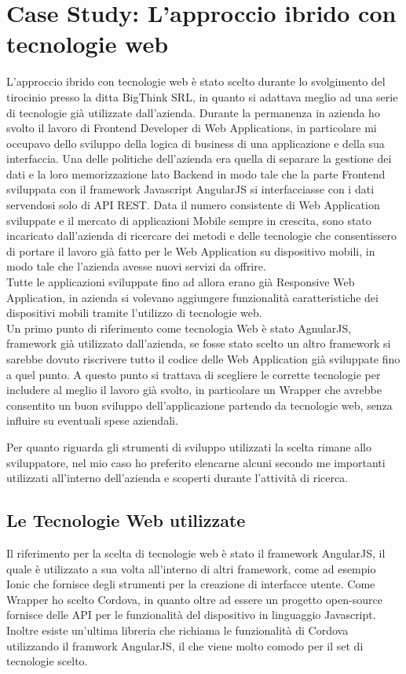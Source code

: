 \chapter{Case Study: L'approccio ibrido con tecnologie web}

L'approccio ibrido con tecnologie web è stato scelto durante lo svolgimento del tirocinio presso la ditta BigThink SRL, in quanto si adattava meglio ad una serie di tecnologie già utilizzate dall'azienda.
Durante la permanenza in azienda ho svolto il lavoro di Frontend Developer di Web Applications, in particolare mi occupavo dello sviluppo della logica di business di una applicazione e della sua interfaccia.
Una delle politiche dell'azienda era quella di separare la gestione dei dati e la loro memorizzazione lato Backend in modo tale che la parte Frontend sviluppata con il framework Javascript AngularJS si interfacciasse con i dati servendosi solo di API REST.
Data il numero consistente di Web Application sviluppate e il mercato di applicazioni Mobile sempre in crescita, sono stato incaricato dall'azienda di ricercare dei metodi e delle tecnologie che consentissero di portare il lavoro già fatto per le Web Application su dispositivo mobili, in modo tale che l'azienda avesse nuovi servizi da offrire.\\
Tutte le applicazioni sviluppate fino ad allora erano già Responsive Web Application, in azienda si volevano aggiungere funzionalità caratteristiche dei dispositivi mobili tramite l'utilizzo di tecnologie web.\\

Un primo punto di riferimento come tecnologia Web è stato AgnularJS, framework già utilizzato dall'azienda, se fosse stato scelto un altro framework si sarebbe dovuto riscrivere tutto il codice delle Web Application già sviluppate fino a quel punto. A questo punto  si trattava di scegliere le corrette tecnologie per includere al meglio il lavoro già svolto, in particolare un Wrapper che avrebbe consentito un buon sviluppo dell'applicazione partendo da tecnologie web, senza influire su eventuali spese aziendali. 

Per quanto riguarda gli strumenti di sviluppo utilizzati la scelta rimane allo sviluppatore, nel mio caso ho preferito elencarne alcuni secondo me importanti utilizzati all'interno dell'azienda e scoperti durante l'attività di ricerca.

\section{Le Tecnologie Web utilizzate}
Il riferimento per la scelta di tecnologie web è stato il framework AngularJS, il quale è utilizzato a sua volta all'interno di altri framework, come ad esempio Ionic che fornisce degli strumenti per la creazione di interfacce utente. Come Wrapper ho scelto Cordova, in quanto oltre ad essere un progetto open-source fornisce delle API per le funzionalità del dispositivo in linguaggio Javascript. Inoltre esiste un'ultima libreria che richiama le funzionalità di Cordova utilizzando il framwork AngularJS, il che viene molto comodo per il set di tecnologie scelto.

